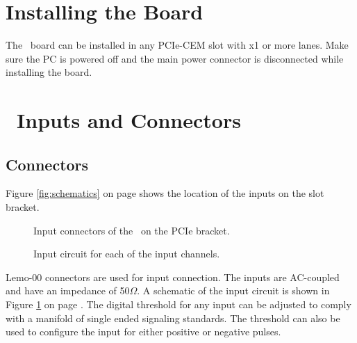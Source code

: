 \section{Installing the Board}
The \deviceName\ board can be installed in any PCIe-CEM slot with x1 or more lanes. 
Make sure the PC is powered off and the main power connector is disconnected while installing the board.\par

%
\section{\deviceName\ Inputs and Connectors}
	\subsection{Connectors}
	Figure \ref{fig:schematics} on page \pageref{fig:schematics} shows the location of the inputs on the slot bracket.
%
	\begin{figure}[hb]
		\begin{center}
			\caption{Input connectors of the \deviceName\ on the PCIe bracket.}
		\end{center}
	\end{figure}
		\begin{figure}[hb]
			\begin{center}
				\caption{Input circuit for each of the input channels.\label{fig:inputcirc}}
			\end{center}
		\end{figure}
	Lemo-00 connectors are used for input connection. The inputs are AC-coupled and have an impedance of 50$\Omega$. 
	A schematic of the input circuit is shown in Figure \ref{fig:inputcirc} on page \pageref{fig:inputcirc}. 
	The digital threshold for any input can be adjusted to comply with a manifold of single ended signaling standards.
	The threshold can also be used to configure the input for either positive or negative pulses.
	
